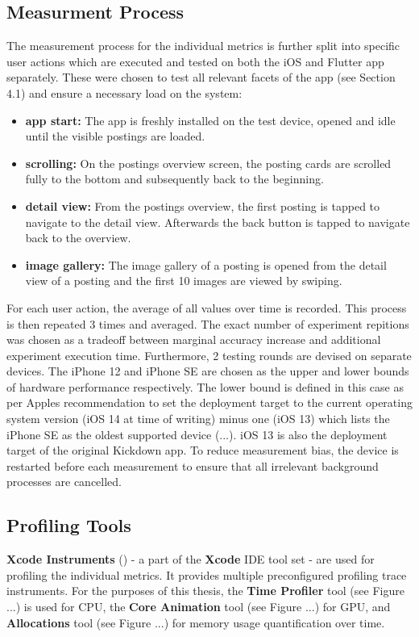 \subsection{Measurment Process} \label{subsection::measurement_process}
The measurement process for the individual metrics is further split into specific user actions
which are executed and tested on both the iOS and Flutter app separately. These were chosen
to test all relevant facets of the app (see Section 4.1) and ensure a necessary load on the system:
\begin{itemize}
    \item \textbf{app start:} The app is freshly installed on the test device, opened and idle until the visible postings are loaded.
    \item \textbf{scrolling:} On the postings overview screen, the posting cards are scrolled fully to the bottom and subsequently back to the beginning.
    \item \textbf{detail view:} From the postings overview, the first posting is tapped to navigate to the detail view. Afterwards the back button is tapped to navigate back to the overview.
    \item \textbf{image gallery:} The image gallery of a posting is opened from the detail view of a posting and the first 10 images are viewed by swiping.
\end{itemize}
For each user action, the average of all values over time is recorded. This process is then
repeated 3 times and averaged. The exact number of experiment repitions was chosen as a
tradeoff between marginal accuracy increase and additional experiment execution time.
Furthermore, 2 testing rounds are devised on separate devices. The iPhone 12 and iPhone
SE are chosen as the upper and lower bounds of hardware performance respectively. The lower
bound is defined in this case as per Apples recommendation to set the deployment target to the
current operating system version (iOS 14 at time of writing) minus one (iOS 13) which lists the
iPhone SE as the oldest supported device (...). iOS 13 is also the deployment
target of the original Kickdown app.
To reduce measurement bias, the device is restarted before each measurement to ensure that all
irrelevant background processes are cancelled.

\subsection{Profiling Tools} \label{subsection::profiling_tooling}
\textbf{Xcode Instruments} (\cite{Apple2019}) - a part of the \textbf{Xcode} IDE tool set - are used for profiling the individual metrics. It provides multiple preconfigured
profiling trace instruments.
For the purposes of this thesis, the \textbf{Time Profiler} tool (see Figure ...) is used for CPU, the \textbf{Core Animation} tool (see Figure ...) for GPU, and 
\textbf{Allocations} tool (see Figure ...) for memory usage quantification over time.


